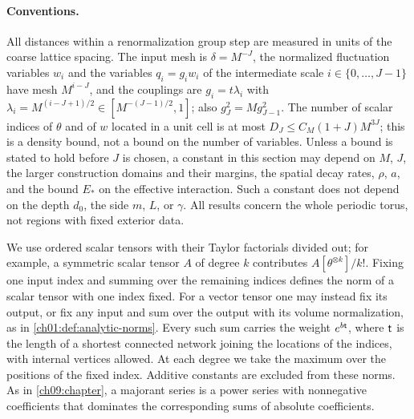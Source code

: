 \paragraph{Conventions.}
All distances within a renormalization group step are measured in units of the coarse lattice spacing. The input mesh is $\delta=M^{-J}$, the normalized fluctuation variables $w_i$ and the variables $q_i=g_iw_i$ of the intermediate scale $i\in\{0,\ldots,J-1\}$ have mesh $M^{i-J}$, and the couplings are $g_i=t\lambda_i$ with $\lambda_i=M^{(i-J+1)/2}\in[M^{-(J-1)/2},1]$; also $g_J^2=Mg_{J-1}^2$. The number of scalar indices of $\theta$ and of $w$ located in a unit cell is at most $D_J\le C_M(1+J)M^{3J}$; this is a density bound, not a bound on the number of variables. Unless a bound is stated to hold before $J$ is chosen, a constant in this section may depend on $M$, $J$, the larger construction domains and their margins, the spatial decay rates, $\rho$, $a$, and the bound $E_*$ on the effective interaction. Such a constant does not depend on the depth $d_0$, the side $m$, $L$, or $\gamma$. All results concern the whole periodic torus, not regions with fixed exterior data.

We use ordered scalar tensors with their Taylor factorials divided out; for example, a symmetric scalar tensor $A$ of degree $k$ contributes $A[\theta^{\otimes k}]/k!$. Fixing one input index and summing over the remaining indices defines the norm of a scalar tensor with one index fixed. For a vector tensor one may instead fix its output, or fix any input and sum over the output with its volume normalization, as in \cref{ch01:def:analytic-norms}. Every such sum carries the weight $e^{b\mathsf t}$, where $\mathsf t$ is the length of a shortest connected network joining the locations of the indices, with internal vertices allowed. At each degree we take the maximum over the positions of the fixed index. Additive constants are excluded from these norms. As in \cref{ch09:chapter}, a majorant series is a power series with nonnegative coefficients that dominates the corresponding sums of absolute coefficients.

